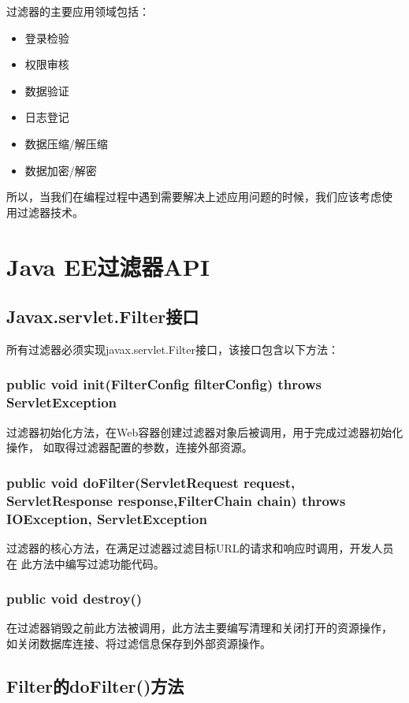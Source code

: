 过滤器的主要应用领域包括：

\begin{itemize}
\item 登录检验
\item 权限审核
\item 数据验证
\item 日志登记
\item 数据压缩/解压缩
\item 数据加密/解密
\end{itemize}

所以，当我们在编程过程中遇到需要解决上述应用问题的时候，我们应该考虑使
用过滤器技术。

\section{Java EE过滤器API}

\subsection{Javax.servlet.Filter接口} 

所有过滤器必须实现javax.servlet.Filter接口，该接口包含以下方法：

\subsubsection{public void init(FilterConfig filterConfig) throws
  ServletException}

过滤器初始化方法，在Web容器创建过滤器对象后被调用，用于完成过滤器初始化操作，
如取得过滤器配置的参数，连接外部资源。

\subsubsection{public void doFilter(ServletRequest request,
  ServletResponse response,FilterChain chain) throws IOException,
  ServletException}

过滤器的核心方法，在满足过滤器过滤目标URL的请求和响应时调用，开发人员在
此方法中编写过滤功能代码。

\subsubsection{public void destroy()}

在过滤器销毁之前此方法被调用，此方法主要编写清理和关闭打开的资源操作，
如关闭数据库连接、将过滤信息保存到外部资源操作。

\subsection{Filter的doFilter()方法} 

